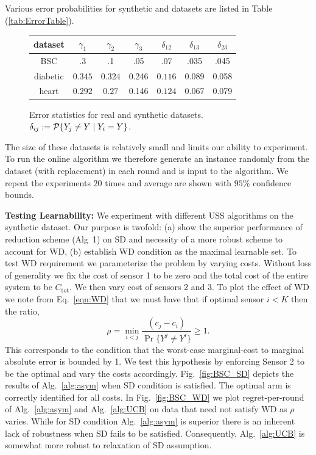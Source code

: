 %
Various error probabilities for synthetic and datasets are listed in Table (\ref{tab:ErrorTable}).  
	\begin{figure}[!h]
		\small
		\begin{tabular}[c]{c|c|c|c|c|c|c } 
			\label{tab:ErrorTable}
			dataset & $\gamma_1$ & $\gamma_2$ & $\gamma_3$ &$\delta_{12}$ & $\delta_{13}$ & $\delta_{23}$ \\ \hline 
			BSC & .3 & .1 & .05 & .07 & .035 & .045\\  \hline
			diabetic & $0.345 $ & $ 0.324$ & 0.246 & $ 0.116 $ & 0.089 &0.058\\  \hline
			heart & $0.292$ & $0.27$ & 0.146 & $0.124$ & 0.067 & 0.079\\  \hline
		\end{tabular}
		\caption{Error statistics for real and synthetic datasets. $\delta_{ij}:=\P\{Y_j\neq Y \mid Y_i = Y\}$.}
\label{tab:error_stats}
\vspace{-.5cm}
	\end{figure}
The size of these datasets is relatively small and limits our ability to experiment. To run the online algorithm we therefore generate an instance randomly from the dataset (with replacement) in each round and is input to the  algorithm. We repeat the experiments $20$ times and average are shown with $95\%$ confidence bounds.

\noindent
{\bf Testing Learnability:}
We experiment with different USS algorithms on the synthetic dataset. Our purpose is twofold: (a) show the superior performance of reduction scheme (Alg~1) on SD and necessity of a more robust scheme to account for WD, (b) establish WD condition as the maximal learnable set. To test WD requirement we parameterize the problem by varying costs. Without loss of generality we fix the cost of sensor 1 to be zero and the total cost of the entire system to be $C_{\mbox{tot}}$. We then vary cost of sensors 2 and 3. To plot the effect of WD we note from Eq.~\ref{eqn:WD} that we must have that if optimal sensor $i <K$ then the ratio,
$$
\rho = \min_{i < j} \frac{(c_j - c_i)}{\Pr\{Y^j \neq Y^i\}} \geq 1.
$$
This corresponds to the condition that the worst-case marginal-cost to marginal absolute error is bounded by 1.
We test this hypothesis by enforcing Sensor 2 to be the optimal and vary the costs accordingly. Fig.~\ref{fig:BSC_SD} depicts the results of Alg.~\ref{alg:asym} when SD condition is satisfied. The optimal arm is correctly identified for all costs. In Fig.~\ref{fig:BSC_WD} we plot regret-per-round of Alg.~\ref{alg:asym} and Alg.~\ref{alg:UCB} on data that need not satisfy WD as $\rho$ varies.  While for SD condition Alg.~\ref{alg:asym} is superior there is an inherent lack of robustness when SD fails to be satisfied. Consequently,  Alg.~\ref{alg:UCB} is somewhat more robust to relaxation of SD assumption.

